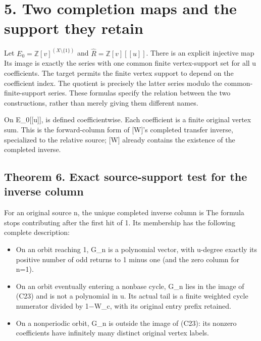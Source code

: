 \section{5. Two completion maps and the support they retain}

Let \(E_0=\mathbb Z[v]^{(X\setminus\{1\})}\) and
\(\widehat R=\mathbb Z[v][[u]]\). There is an explicit injective map
Its image is exactly the series with one common finite vertex-support
set for all u coefficients. The target permits the finite vertex support
to depend on the coefficient index. The quotient is precisely the latter
series modulo the common-finite-support series. These formulas specify
the relation between the two constructions, rather than merely giving
them different names.

On E\_0{[}{[}u{]}{]}, 
is defined coefficientwise. Each coefficient is a finite original vertex
sum. This is the forward-column form of {[}W{]}'s completed transfer
inverse, specialized to the relative source; {[}W{]} already contains
the existence of the completed inverse.

\subsection{Theorem 6. Exact source-support test for the inverse column}

For an original source n, the unique completed inverse column is
The formula stops contributing after the first hit of 1. Its membership
has the following complete description:

\begin{itemize}
\tightlist
\item
  On an orbit reaching 1, G\_n is a polynomial vector, with u-degree
  exactly its positive number of odd returns to 1 minus one (and the
  zero column for n=1).
\item
  On an orbit eventually entering a nonbase cycle, G\_n lies in the
  image of (C23) and is not a polynomial in u. Its actual tail is a
  finite weighted cycle numerator divided by 1−W\_c, with its original
  entry prefix retained.
\item
  On a nonperiodic orbit, G\_n is outside the image of (C23): its
  nonzero coefficients have infinitely many distinct original vertex
  labels.
\end{itemize}


